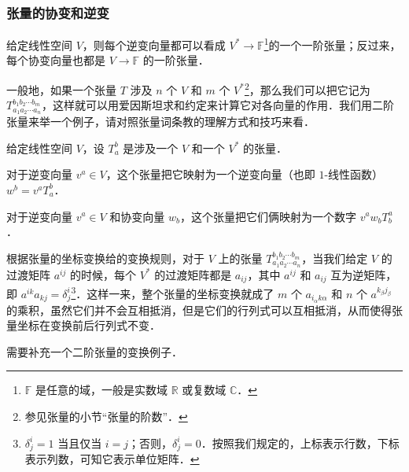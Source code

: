 \subsubsection{张量的协变和逆变}

给定线性空间 $V$，则每个逆变向量都可以看成 $V^*\rightarrow \mathbb{F}$\footnote{$\mathbb{F}$ 是任意的域，一般是实数域 $\mathbb{R}$ 或复数域 $\mathbb{C}$．}的一个一阶张量；反过来，每个协变向量也都是 $V\rightarrow \mathbb{F}$ 的一阶张量．

一般地，如果一个张量 $T$ 涉及 $n$ 个 $V$ 和 $m$ 个 $V^*$\footnote{参见张量的小节“张量的阶数”．}，那么我们可以把它记为 $T^{b_1b_2\cdots b_m}_{a_1a_2\cdots a_n}$，这样就可以用爱因斯坦求和约定来计算它对各向量的作用．我们用二阶张量来举一个例子，请对照张量词条教的理解方式和技巧来看．

\begin{example}{}
给定线性空间 $V$，设 $T^b_a$ 是涉及一个 $V$ 和一个 $V^*$ 的张量．

对于逆变向量 $v^a\in V$，这个张量把它映射为一个逆变向量（也即 $1$-线性函数）$w^b=v^aT^b_a$．

对于逆变向量 $v^a\in V$ 和协变向量 $w_b$，这个张量把它们俩映射为一个数字 $v^aw_bT^a_b$．
\end{example}

根据张量的坐标变换给的变换规则，对于 $V$ 上的张量 $T^{b_1b_2\cdots b_m}_{a_1a_2\cdots a_n}$，当我们给定 $V$ 的过渡矩阵 $a^{ij}$ 的时候，每个 $V^*$ 的过渡矩阵都是 $a_{ij}$，其中 $a^{ij}$ 和 $a_{ij}$ 互为逆矩阵，即 $a^{ik}a_{kj}=\delta^i_j$\footnote{$\delta^i_j=1$ 当且仅当 $i=j$；否则，$\delta^i_j=0$．按照我们规定的，上标表示行数，下标表示列数，可知它表示单位矩阵．}．这样一来，整个张量的坐标变换就成了 $m$ 个 $a_{i_\alpha k\alpha}$ 和 $n$ 个 $a^{k_\beta j_\beta}$ 的乘积，虽然它们并不会互相抵消，但是它们的行列式可以互相抵消，从而使得张量坐标在变换前后行列式不变．


\begin{issues}
需要补充一个二阶张量的变换例子．
\end{issues}














